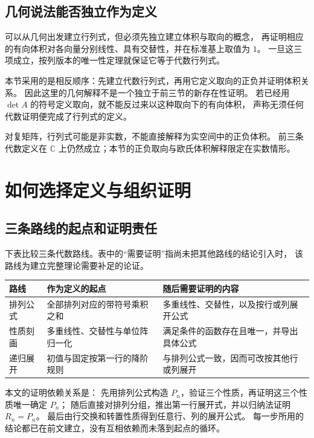 \documentclass[UTF8,12pt,a4paper,fontset=fandol]{ctexart}
\begin{document}
\subsection{几何说法能否独立作为定义}

可以从几何出发建立行列式，但必须先独立建立体积与取向的概念，
再证明相应的有向体积对各向量分别线性、具有交替性，并在标准基上取值为 $1$。
一旦这三项成立，按列版本的唯一性定理就保证它等于代数行列式。

本节采用的是相反顺序：先建立代数行列式，再用它定义取向的正负并证明体积关系。
因此这里的几何解释不是一个独立于前三节的新存在性证明。
若已经用 $\det A$ 的符号定义取向，就不能反过来以这种取向下的有向体积，
声称无须任何代数证明便完成了行列式的定义。

对复矩阵，行列式可能是非实数，不能直接解释为实空间中的正负体积。
前三条代数定义在 $\mathbb C$ 上仍然成立；本节的正负取向与欧氏体积解释限定在实数情形。

\section{如何选择定义与组织证明}

\subsection{三条路线的起点和证明责任}

下表比较三条代数路线。表中的“需要证明”指尚未把其他路线的结论引入时，
该路线为建立完整理论需要补足的论证。
\begin{center}
  \begin{tabularx}{\textwidth}{@{}lYY@{}}
    \toprule
    路线 & 作为定义的起点 & 随后需要证明的内容\\
    \midrule
    排列公式 & 全部排列对应的带符号乘积之和
      & 多重线性、交替性，以及按行或列展开公式\\
    性质刻画 & 多重线性、交替性与单位阵归一化
      & 满足条件的函数存在且唯一，并导出具体公式\\
    递归展开 & 初值与固定按第一行的降阶规则
      & 与排列公式一致，因而可改按其他行或列展开\\
    \bottomrule
  \end{tabularx}
\end{center}

本文的证明依赖关系是：
先用排列公式构造 $P_n$，验证三个性质，再证明这三个性质唯一确定 $P_n$；
随后直接对排列分组，推出第一行展开式，并以归纳法证明 $R_n=P_n$。
最后由行交换和转置性质得到任意行、列的展开公式。
每一步所用的结论都已在前文建立，没有互相依赖而未落到起点的循环。
\end{document}
